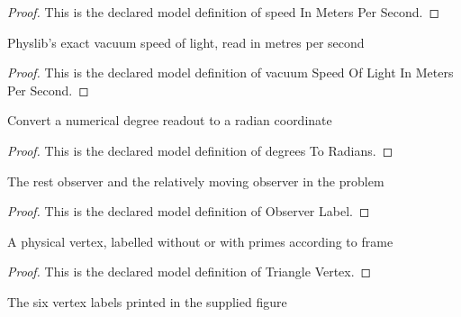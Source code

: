 \begin{proof}
  This is the declared model definition of speed In Meters Per Second.
\end{proof}
\begin{definition}
  \label{def:physics:phyx-mini-0566:phyxminiproblems-problemphyxmini0566-vacuumspeedoflightinmeterspersecond}
  Physlib's exact vacuum speed of light, read in metres per second
\end{definition}
\begin{proof}
  This is the declared model definition of vacuum Speed Of Light In Meters Per Second.
\end{proof}
\begin{definition}
  \label{def:physics:phyx-mini-0566:phyxminiproblems-problemphyxmini0566-degreestoradians}
  Convert a numerical degree readout to a radian coordinate
\end{definition}
\begin{proof}
  This is the declared model definition of degrees To Radians.
\end{proof}
\begin{definition}
  \label{def:physics:phyx-mini-0566:phyxminiproblems-problemphyxmini0566-observerlabel}
  The rest observer and the relatively moving observer in the problem
\end{definition}
\begin{proof}
  This is the declared model definition of Observer Label.
\end{proof}
\begin{definition}
  \label{def:physics:phyx-mini-0566:phyxminiproblems-problemphyxmini0566-trianglevertex}
  A physical vertex, labelled without or with primes according to frame
\end{definition}
\begin{proof}
  This is the declared model definition of Triangle Vertex.
\end{proof}
\begin{definition}
  \label{def:physics:phyx-mini-0566:phyxminiproblems-problemphyxmini0566-figurevertexlabel}
  The six vertex labels printed in the supplied figure
\end{definition}
